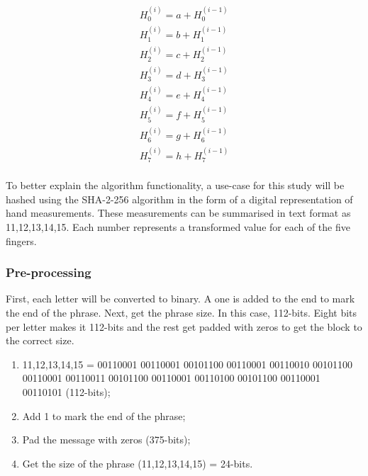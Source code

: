 \begin{enumerate}
            \begin{gather*}
                H^{(i)}_0 = a + H^{(i-1)}_0 \\
                H^{(i)}_1 = b + H^{(i-1)}_1 \\
                H^{(i)}_2 = c + H^{(i-1)}_2 \\
                H^{(i)}_3 = d + H^{(i-1)}_3 \\
                H^{(i)}_4 = e + H^{(i-1)}_4 \\
                H^{(i)}_5 = f + H^{(i-1)}_5 \\
                H^{(i)}_6 = g + H^{(i-1)}_6 \\
                H^{(i)}_7 = h + H^{(i-1)}_7 \\
            \end{gather*}
        
    \end{enumerate}
    
    To better explain the algorithm functionality, a use-case for this study will be hashed using the SHA-2-256 algorithm in the form of a digital representation of hand measurements. These measurements can be summarised in text format as 11,12,13,14,15. Each number represents a transformed value for each of the five fingers.
    
    
        
        \subsubsection{ Pre-processing}
        First, each letter will be converted to binary. A one is added to the end to mark the end of the phrase. Next, get the phrase size. In this case, 112-bits. Eight bits per letter makes it 112-bits and the rest get padded with zeros to get the block to the correct size. 
        
        \begin{enumerate}[label=\roman*.]
            
            \item 11,12,13,14,15 = 00110001 00110001 00101100 00110001 00110010 00101100 00110001 00110011 00101100 00110001 00110100 00101100 00110001 00110101 (112-bits);
            
            \item Add 1 to mark the end of the phrase;
            
            \item Pad the message with zeros (375-bits);
            
            \item Get the size of the phrase (11,12,13,14,15) = 24-bits.
            
        \end{enumerate}
        
